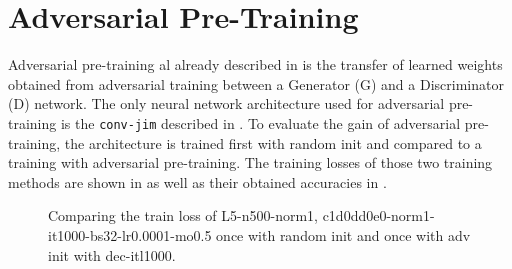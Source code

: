 
\section{Adversarial Pre-Training}\label{sec:exp_adv}
\thesisStateNotReady
Adversarial pre-training al already described in  is the transfer of learned weights obtained from adversarial training between a Generator (G) and a Discriminator (D) network.
The only neural network architecture used for adversarial pre-training is the \texttt{conv-jim} described in .
To evaluate the gain of adversarial pre-training, the architecture is trained first with random init and compared to a training with adversarial pre-training. 
The training losses of those two training methods are shown in  as well as their obtained accuracies in .

\begin{figure}[!ht]
  \centering
  \caption{Comparing the train loss of L5-n500-norm1, c1d0dd0e0-norm1-it1000-bs32-lr0.0001-mo0.5 once with random init and once with adv init with dec-itl1000.}
  \label{fig:exp_adv_fc3_train_loss}
\end{figure}
\FloatBarrier
\noindent

